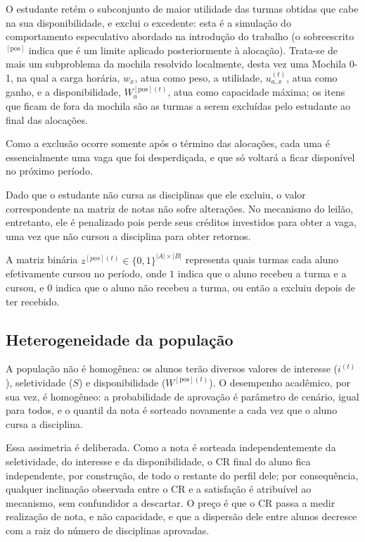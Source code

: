 \documentclass[
    12pt,
    openany,
    oneside,
    a4paper,
    english,
    brazil
]{abntex2}
\begin{document}
O estudante retém o subconjunto de maior utilidade das turmas obtidas que cabe na sua disponibilidade, e exclui o excedente: esta é a simulação do comportamento especulativo abordado na introdução do trabalho (o sobreescrito $^{[\text{pos}]}$ indica que é um limite aplicado posteriormente à alocação). Trata-se de mais um subproblema da mochila resolvido localmente, desta vez uma Mochila 0-1, na qual a carga horária, $w_x$, atua como peso, a utilidade, $u_{a, x}^{(t)}$, atua como ganho, e a disponibilidade, $W_a^{[\text{pos}](t)}$, atua como capacidade máxima; os itens que ficam de fora da mochila são as turmas a serem excluídas pelo estudante ao final das alocações.

Como a exclusão ocorre somente após o término das alocações, cada uma é essencialmente uma vaga que foi desperdiçada, e que só voltará a ficar disponível no próximo período.

Dado que o estudante não cursa as disciplinas que ele excluiu, o valor correspondente na matriz de notas não sofre alterações. No mecanismo do leilão, entretanto, ele é penalizado pois perde seus créditos investidos para obter a vaga, uma vez que não cursou a disciplina para obter retornos.

A matriz binária $z^{[pos](t)} \in \{0, 1\}^{|A| \times |B|}$ representa quais turmas cada aluno efetivamente cursou no período, onde $1$ indica que o aluno recebeu a turma e a cursou, e $0$ indica que o aluno não recebeu a turma, ou então a excluiu depois de ter recebido.

\subsection{Heterogeneidade da população}

A população não é homogênea: os alunos terão diversos valores de interesse ($i^{(t)}$), seletividade ($S$) e disponibilidade ($W^{[\text{pos}](t)}$). O desempenho acadêmico, por sua vez, é homogêneo: a probabilidade de aprovação é parâmetro de cenário, igual para todos, e o quantil da nota é sorteado novamente a cada vez que o aluno cursa a disciplina.

Essa assimetria é deliberada. Como a nota é sorteada independentemente da seletividade, do interesse e da disponibilidade, o CR final do aluno fica independente, por construção, de todo o restante do perfil dele; por consequência, qualquer inclinação observada entre o CR e a satisfação é atribuível ao mecanismo, sem confundidor a descartar. O preço é que o CR passa a medir realização de nota, e não capacidade, e que a dispersão dele entre alunos decresce com a raiz do número de disciplinas aprovadas.
\end{document}
